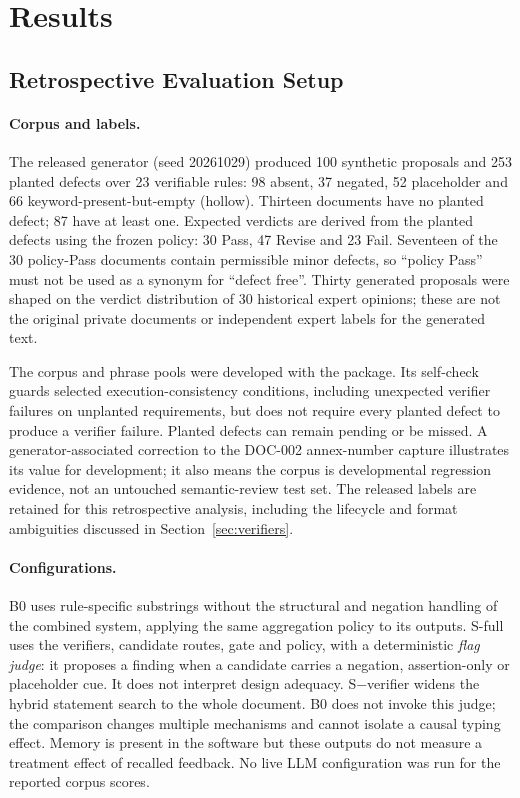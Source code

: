 \section{Results}\label{sec:results}

\subsection{Retrospective Evaluation Setup}

\paragraph{Corpus and labels.}
The released generator (seed 20261029) produced 100 synthetic proposals and 253 planted defects over 23 verifiable rules: 98 absent, 37 negated, 52 placeholder and 66 keyword-present-but-empty (hollow). Thirteen documents have no planted defect; 87 have at least one. Expected verdicts are derived from the planted defects using the frozen policy: 30 Pass, 47 Revise and 23 Fail. Seventeen of the 30 policy-Pass documents contain permissible minor defects, so ``policy Pass'' must not be used as a synonym for ``defect free''. Thirty generated proposals were shaped on the verdict distribution of 30 historical expert opinions; these are not the original private documents or independent expert labels for the generated text.

The corpus and phrase pools were developed with the package. Its self-check guards selected execution-consistency conditions, including unexpected verifier failures on unplanted requirements, but does not require every planted defect to produce a verifier failure. Planted defects can remain pending or be missed. A generator-associated correction to the DOC-002 annex-number capture illustrates its value for development; it also means the corpus is developmental regression evidence, not an untouched semantic-review test set. The released labels are retained for this retrospective analysis, including the lifecycle and format ambiguities discussed in Section~\ref{sec:verifiers}.

\paragraph{Configurations.}
B0 uses rule-specific substrings without the structural and negation handling of the combined system, applying the same aggregation policy to its outputs. S-full uses the verifiers, candidate routes, gate and policy, with a deterministic \emph{flag judge}: it proposes a finding when a candidate carries a negation, assertion-only or placeholder cue. It does not interpret design adequacy. S$-$verifier widens the hybrid statement search to the whole document. B0 does not invoke this judge; the comparison changes multiple mechanisms and cannot isolate a causal typing effect. Memory is present in the software but these outputs do not measure a treatment effect of recalled feedback. No live LLM configuration was run for the reported corpus scores.

